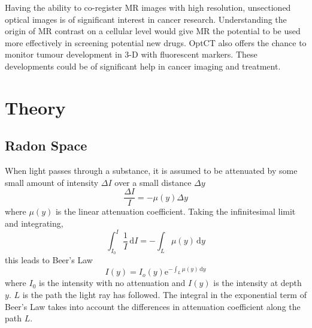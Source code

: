 Having the ability to co-register MR images with high resolution, unsectioned optical images  is of significant  interest in cancer research. Understanding the origin of MR contrast on a cellular level would give MR the potential to be used more effectively in screening potential new drugs. OptCT also offers the chance to monitor tumour development in 3-D with fluorescent markers. These developments could be of significant help  in cancer imaging and treatment.





\section{Theory}
\label{sec:theory}




\subsection{Radon Space}

When light passes through a substance, it is assumed to be attenuated by some small amount of intensity $\Delta I$ over a small distance $\Delta y$ 
\begin{equation}
\dfrac{\Delta I}{I} = -\mu(y)\Delta y
\end{equation}
where $\mu(y)$ is the linear attenuation coefficient.
Taking the infinitesimal limit and integrating, 
\begin{equation}
\int_{I_0}^{I} \frac{1}{I}\, \mathrm{d}I = - \int_L \mu(y)\, \mathrm{d}y
\end{equation}
this leads to Beer's Law 
\begin{equation}
I(y) = I_{o}(y)\mathrm{e}^{-\int_L \mu(y)\, \mathrm{d}y}
\label{eq:Beer}
\end{equation}
where $I_0$ is the intensity with no attenuation and $I(y)$ is the intensity at depth $y$. $L$ is the path the light ray has followed. The integral in the exponential term of Beer's Law takes into account the differences in attenuation coefficient along the path $L$. 


